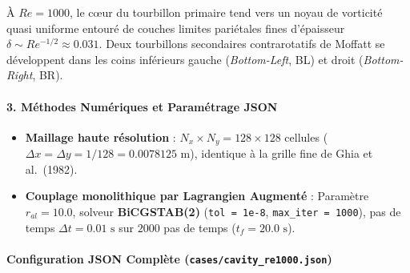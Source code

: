\documentclass[
  10pt,
]{article}
\providecommand{\tightlist}{%
  \setlength{\itemsep}{0pt}\setlength{\parskip}{0pt}}
\begin{document}
À \(Re = 1000\), le cœur du tourbillon primaire tend vers un noyau de
vorticité quasi uniforme entouré de couches limites pariétales fines
d'épaisseur \(\delta \sim Re^{-1/2} \approx 0.031\). Deux tourbillons
secondaires contrarotatifs de Moffatt se développent dans les coins
inférieurs gauche (\emph{Bottom-Left}, BL) et droit
(\emph{Bottom-Right}, BR).

\paragraph{3. Méthodes Numériques et Paramétrage
JSON}\label{muxe9thodes-numuxe9riques-et-paramuxe9trage-json-3}

\begin{itemize}
\tightlist
\item
  \textbf{Maillage haute résolution} :
  \(N_x \times N_y = 128 \times 128\) cellules
  (\(\Delta x = \Delta y = 1/128 = 0.0078125\text{ m}\)), identique à la
  grille fine de Ghia et al.~(1982).
\item
  \textbf{Couplage monolithique par Lagrangien Augmenté} : Paramètre
  \(r_{al} = 10.0\), solveur \textbf{BiCGSTAB(2)}
  (\texttt{tol\ =\ 1e-8}, \texttt{max\_iter\ =\ 1000}), pas de temps
  \(\Delta t = 0.01\text{ s}\) sur \(2000\) pas de temps
  (\(t_f = 20.0\text{ s}\)).
\end{itemize}

\paragraph{\texorpdfstring{Configuration JSON Complète
(\texttt{cases/cavity\_re1000.json})}{Configuration JSON Complète (cases/cavity\_re1000.json)}}\label{configuration-json-compluxe8te-casescavity_re1000.json}
\end{document}
